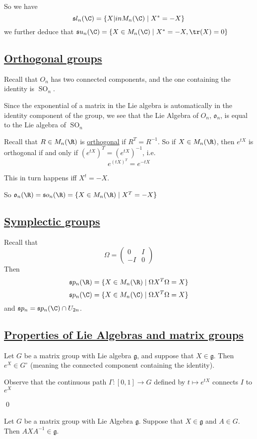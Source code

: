 \documentclass[x11names,reqno,14pt]{extarticle}
\newcommand{\pmat}[4]{\begin{pmatrix} #1 & #2 \\ #3 & #4 \end{pmatrix}}
\newcommand{\mk}[1]{\mathfrak{#1}}
\DeclareMathOperator{\SO}{SO}
\begin{document}
So we have
\[
\mk{s}l_n(\C) = \{X|in M_n(\C) \mid X^* = -X\}
\]
we further deduce that $\mk{s}u_n(\C) = \{X\in M_n(\C) \mid X^* = -X, \tr(X) = 0\}$

\subsection*{\underline{Orthogonal groups}}

Recall that $O_n$ has two connected components, and the one containing the identity is $\SO_n$.

Since the exponential of a matrix in the Lie algebra is automatically in the identity component of the group, we see that the Lie Algebra of $O_n$, $\mk{o}_n$, is equal to the Lie algebra of $\SO_n$

Recall that $R \in M_n(\R)$ is \underline{orthogonal} if $R^T = R^{-1}$. So if $X \in M_n(\R)$, then $e^{tX}$ is orthogonal if and only if $(e^{tX})^T = (e^{tX})^{-1}$, i.e. 
\[
e^{(tX)^T} = e^{-tX}
\]

This in turn happens iff $X^t = -X$. 

So $\mk{o}_n(\R) = \mk{s}o_n(\R) = \{X\in M_n(\R) \mid X^T = -X\}$

\subsection*{\underline{Symplectic groups}}

Recall that
\[
\Omega = \pmat{0}{I}{-I}{0}
\]
Then 
\[
\mk{s}p_n(\R) = \{X \in M_n (\R) \mid \Omega X^T \Omega = X\}
\]
\[
\mk{s}p_n(\C) = \{X \in M_n(\C) \mid \Omega X^T \Omega = X \}
\]
and $\mk{s}p_n = \mk{s}p_n(\C) \cap U_{2n}$. 

\subsection*{\underline{Properties of Lie Algebras and matrix groups}}

\prop

Let $G$ be a matrix group with Lie algebra $\mk{g}$, and suppose that $X \in \mk{g}$. Then $e^{X} \in G^\circ$ (meaning the connected component containing the identity). 

\proof

Observe that the continuous path $\Gamma:[0,1]\to G$ defined by $t \mapsto e^{tX}$ connects $I$ to $e^X$

\qed

\prop

Let $G$ be a matrix group with Lie Algebra $\mk{g}$. Suppose that $X \in \mk{g}$ and $A \in G$. Then $AXA^{-1} \in \mk{g}$. 
\end{document}
